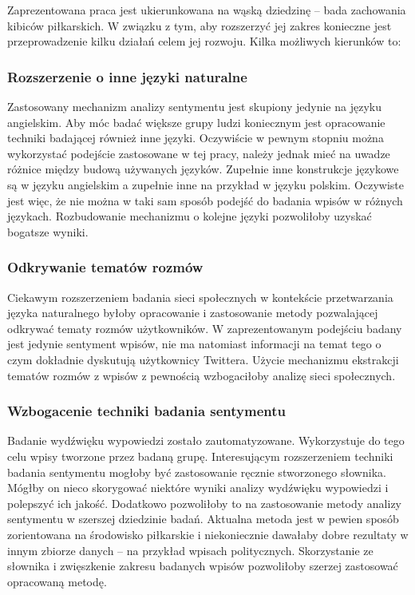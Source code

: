 Zaprezentowana praca jest ukierunkowana na wąską dziedzinę -- bada zachowania
kibiców piłkarskich. W związku z tym, aby rozszerzyć jej zakres konieczne
jest przeprowadzenie kilku działań celem jej rozwoju. Kilka możliwych kierunków to:

\subsubsection{Rozszerzenie o inne języki naturalne}
Zastosowany mechanizm analizy sentymentu jest skupiony jedynie na
języku angielskim. Aby móc badać większe grupy ludzi koniecznym jest opracowanie
techniki badającej również inne języki. Oczywiście w pewnym stopniu można 
wykorzystać podejście zastosowane w tej pracy, należy jednak mieć na uwadze
różnice między budową używanych języków. Zupełnie inne konstrukcje językowe
są w języku angielskim a zupełnie inne na przykład w języku polskim.
Oczywiste jest więc, że nie można w taki sam sposób podejść do badania
wpisów w różnych językach. Rozbudowanie mechanizmu o kolejne języki pozwoliłoby
uzyskać bogatsze wyniki.

\subsubsection{Odkrywanie tematów rozmów}
Ciekawym rozszerzeniem badania sieci społecznych w kontekście przetwarzania
języka naturalnego byłoby opracowanie i zastosowanie metody pozwalającej
odkrywać tematy rozmów użytkowników. W zaprezentowanym podejściu badany jest
jedynie sentyment wpisów, nie ma natomiast informacji na temat tego o czym dokładnie
dyskutują użytkownicy Twittera. Użycie mechanizmu ekstrakcji tematów rozmów
z wpisów z pewnością wzbogaciłoby analizę sieci społecznych.


\subsubsection{Wzbogacenie techniki badania sentymentu}
Badanie wydźwięku wypowiedzi zostało zautomatyzowane. Wykorzystuje do tego celu
wpisy tworzone przez badaną grupę. Interesującym rozszerzeniem techniki badania 
sentymentu mogłoby być zastosowanie ręcznie stworzonego słownika.
Mógłby on nieco skorygować niektóre wyniki analizy wydźwięku wypowiedzi i
polepszyć ich jakość. Dodatkowo pozwoliłoby to na zastosowanie metody analizy sentymentu
w szerszej dziedzinie badań. Aktualna metoda jest w pewien sposób zorientowana
na środowisko piłkarskie i niekoniecznie dawałaby dobre rezultaty w innym
zbiorze danych -- na przykład wpisach politycznych. Skorzystanie ze słownika
i zwięszkenie zakresu badanych wpisów pozwoliłoby szerzej zastosować
opracowaną metodę.


